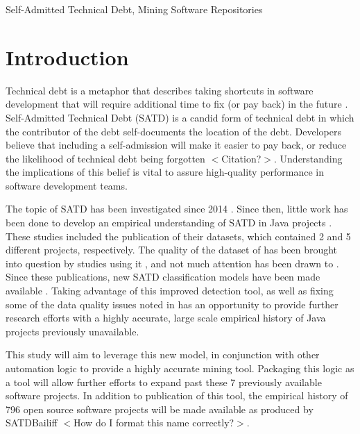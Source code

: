\documentclass[conference]{IEEEtran}
\begin{document}
\begin{IEEEkeywords}
Self-Admitted Technical Debt, Mining Software Repositories
\end{IEEEkeywords}

\section{Introduction}
Technical debt is a metaphor that describes taking shortcuts in software development that will require additional time to fix (or pay back) in the future \cite{Kruchten}. 
Self-Admitted Technical Debt (SATD) is a candid form of technical debt in which the contributor of the debt self-documents the location of the debt.
Developers believe that including a self-admission will make it easier to pay back, or reduce the likelihood of technical debt being forgotten $<$Citation?$>$. Understanding the implications of this belief is vital to assure high-quality performance in software development teams.

The topic of SATD has been investigated since 2014 \cite{Potdar}. Since then, little work has been done to develop an empirical understanding of SATD in Java projects \cite{Maldonado, Bavota}.
These studies included the publication of their datasets, which contained 2 and 5 different projects, respectively. The quality of the dataset of \cite{Maldonado} has been brought into question by studies using it \cite{Zampetti}, and not much attention has been drawn to \cite{Bavota}.
Since these publications, new SATD classification models have been made available \cite{Huang}.
Taking advantage of this improved detection tool, as well as fixing some of the data quality issues noted in \cite{Maldonado} has an opportunity to provide further research efforts with a highly accurate, large scale empirical history of Java projects previously unavailable.

This study will aim to leverage this new model, in conjunction with other automation logic to provide a highly accurate mining tool. Packaging this logic as a tool will allow further efforts to expand past these 7 previously available software projects. In addition to publication of this tool, the empirical history of 796 open source software projects will be made available as produced by SATDBailiff $<$How do I format this name correctly?$>$.
\end{document}
